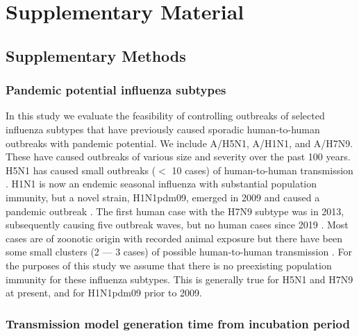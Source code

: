 \documentclass{article}
\begin{document}



\clearpage

\section*{Supplementary Material}

\setcounter{figure}{0}
\renewcommand{\thefigure}{S\arabic{figure}}


\subsection*{Supplementary Methods}

\subsubsection*{Pandemic potential influenza subtypes}

In this study we evaluate the feasibility of controlling outbreaks of selected influenza subtypes that have previously caused sporadic human-to-human outbreaks with pandemic potential. We include A/H5N1, A/H1N1, and A/H7N9. These have caused outbreaks of various size and severity over the past 100 years. H5N1 has caused small outbreaks ($<$ 10 cases) of human-to-human transmission \citep{yangDetectingHumanhumanTransmission2007a, aditamaAvianInfluenzaH5N12012a}. H1N1 is now an endemic seasonal influenza with substantial population immunity, but a novel strain, H1N1pdm09, emerged in 2009 and caused a pandemic outbreak \citep{fraserPandemicPotentialStrain2009, lesslerOutbreak2009Pandemic2009}. The first human case with the H7N9 subtype was in 2013, subsequently causing five outbreak waves, but no human cases since 2019 \citep{liH7N9InfluenzaVirus2021}. Most cases are of zoonotic origin with recorded animal exposure but there have been some small clusters (2 --- 3 cases) of possible human-to-human transmission \citep{liEpidemiologyHumanInfections2014}. For the purposes of this study we assume that there is no preexisting population immunity for these influenza subtypes. This is generally true for H5N1 and H7N9 at present, and for H1N1pdm09 prior to 2009.

\subsubsection*{Transmission model generation time from incubation period}
\end{document}
